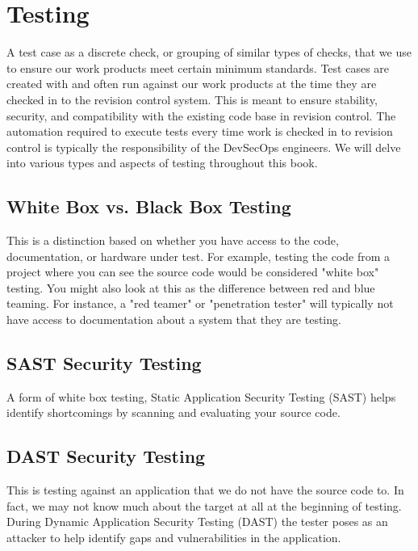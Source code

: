 \section{Testing}

\justifying
A test case as a discrete check, or grouping of similar types of checks,
that we use to ensure our work products meet certain minimum standards. Test cases are created with
and often run against our work products at the time they are checked in to the revision control system.
This is meant to ensure stability, security, and compatibility with the existing code base in revision
control. The automation required to execute tests every time work is checked in to
revision control is typically the responsibility of the DevSecOps engineers. We will delve into various
types and aspects of testing throughout this book.

\subsection{White Box vs. Black Box Testing}

\justifying
This is a distinction based on whether you have access to the code, documentation, or hardware under test.
For example, testing the code from a project where you can see the source code would be considered "white box"
testing. You might also look at this as the difference between red and blue
teaming. For instance, a "red teamer" or "penetration tester" will typically not have
access to documentation about a system that they are testing.

\subsection{SAST Security Testing}

\justifying
A form of white box testing, Static Application Security Testing (SAST) helps identify
shortcomings by scanning and evaluating your source code.

\subsection{DAST Security Testing}

\justifying
This is testing against an application that we do not have the source code to. In fact, we may not know much
about the target at all at the beginning of testing. During Dynamic Application Security Testing (DAST)
the tester poses as an attacker to help identify gaps and vulnerabilities in the application.

